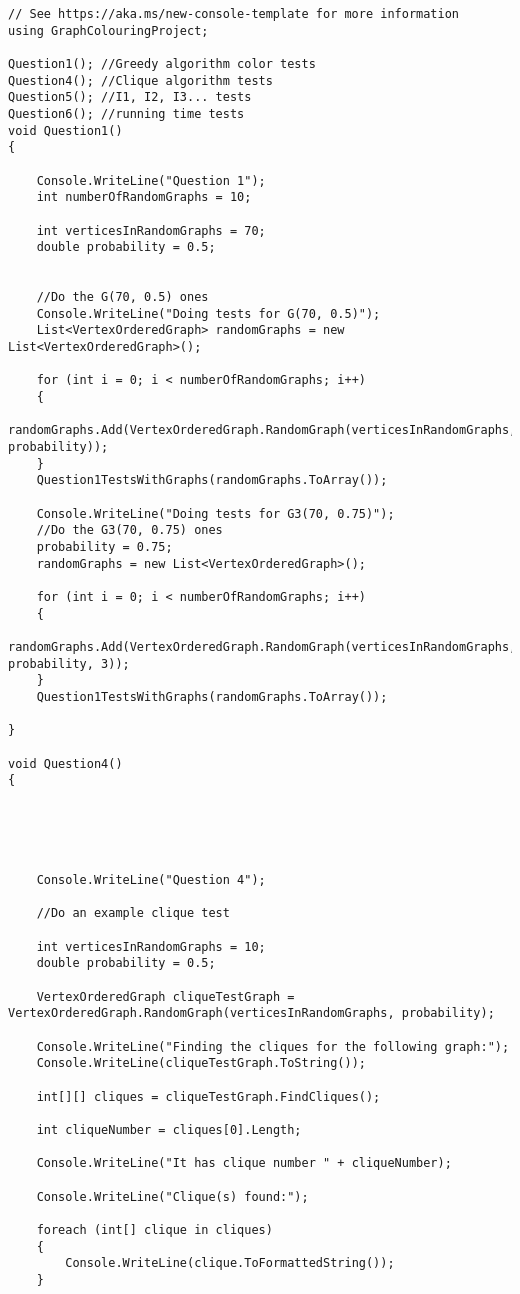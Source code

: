 \documentclass{article}
\begin{document}
\begin{lstlisting}
// See https://aka.ms/new-console-template for more information
using GraphColouringProject;

Question1(); //Greedy algorithm color tests
Question4(); //Clique algorithm tests
Question5(); //I1, I2, I3... tests
Question6(); //running time tests
void Question1()
{
	
	Console.WriteLine("Question 1");
	int numberOfRandomGraphs = 10;
	
	int verticesInRandomGraphs = 70;
	double probability = 0.5;
	
	
	//Do the G(70, 0.5) ones
	Console.WriteLine("Doing tests for G(70, 0.5)");
	List<VertexOrderedGraph> randomGraphs = new List<VertexOrderedGraph>();
	
	for (int i = 0; i < numberOfRandomGraphs; i++)
	{
		randomGraphs.Add(VertexOrderedGraph.RandomGraph(verticesInRandomGraphs, probability));
	}
	Question1TestsWithGraphs(randomGraphs.ToArray());
	
	Console.WriteLine("Doing tests for G3(70, 0.75)");
	//Do the G3(70, 0.75) ones
	probability = 0.75;
	randomGraphs = new List<VertexOrderedGraph>();
	
	for (int i = 0; i < numberOfRandomGraphs; i++)
	{
		randomGraphs.Add(VertexOrderedGraph.RandomGraph(verticesInRandomGraphs, probability, 3));
	}
	Question1TestsWithGraphs(randomGraphs.ToArray());
	
}

void Question4()
{
	
	
	
	
	
	Console.WriteLine("Question 4");
	
	//Do an example clique test
	
	int verticesInRandomGraphs = 10;
	double probability = 0.5;
	
	VertexOrderedGraph cliqueTestGraph = VertexOrderedGraph.RandomGraph(verticesInRandomGraphs, probability);
	
	Console.WriteLine("Finding the cliques for the following graph:");
	Console.WriteLine(cliqueTestGraph.ToString());
	
	int[][] cliques = cliqueTestGraph.FindCliques();
	
	int cliqueNumber = cliques[0].Length;
	
	Console.WriteLine("It has clique number " + cliqueNumber);
	
	Console.WriteLine("Clique(s) found:");
	
	foreach (int[] clique in cliques)
	{
		Console.WriteLine(clique.ToFormattedString());
	}
	

\end{lstlisting}
\end{document}
